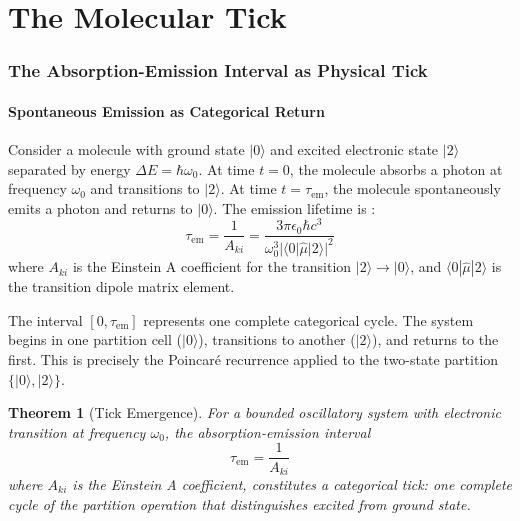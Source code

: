 \documentclass[11pt,a4paper]{article}
\newtheorem{theorem}{Theorem}[section]
\theoremstyle{definition}
\theoremstyle{remark}
\newcommand{\tem}{\tau_{\mathrm{em}}}
\newcommand{\Aki}{A_{ki}}
\begin{document}

\part{The Molecular Tick}

\section{The Absorption-Emission Interval as Physical Tick}
\label{sec:tick}

\subsection{Spontaneous Emission as Categorical Return}

Consider a molecule with ground state $|0\rangle$ and excited electronic state $|2\rangle$ separated by energy $\Delta E = \hbar\omega_0$. At time $t = 0$, the molecule absorbs a photon at frequency $\omega_0$ and transitions to $|2\rangle$. At time $t = \tem$, the molecule spontaneously emits a photon and returns to $|0\rangle$. The emission lifetime is \citep{einstein1917, dirac1928}:
\begin{equation}
\tem = \frac{1}{\Aki} = \frac{3\pi \epsilon_0 \hbar c^3}{\omega_0^3 |\langle 0 | \hat{\mu} | 2 \rangle|^2}
\label{eq:emission_lifetime}
\end{equation}
where $\Aki$ is the Einstein A coefficient for the transition $|2\rangle \to |0\rangle$, and $\langle 0 | \hat{\mu} | 2 \rangle$ is the transition dipole matrix element.

The interval $[0, \tem]$ represents one complete categorical cycle. The system begins in one partition cell ($|0\rangle$), transitions to another ($|2\rangle$), and returns to the first. This is precisely the Poincar\'{e} recurrence applied to the two-state partition $\{|0\rangle, |2\rangle\}$.

\begin{theorem}[Tick Emergence]
\label{thm:tick_emergence}
For a bounded oscillatory system with electronic transition at frequency $\omega_0$, the absorption-emission interval
\begin{equation}
\tem = \frac{1}{\Aki}
\label{eq:tick_period}
\end{equation}
where $\Aki$ is the Einstein A coefficient, constitutes a categorical tick: one complete cycle of the partition operation that distinguishes excited from ground state.
\end{theorem}
\end{document}
